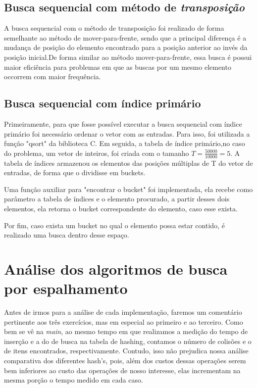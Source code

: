 \documentclass{article}
\begin{document}
\subsection{Busca sequencial com método de \textit{transposição}}
%
A busca sequencial com o método de transposição foi realizado de forma semelhante ao método de mover-para-frente, sendo que a principal diferença é a mudança de posição do elemento encontrado para a posição anterior ao invés da posição inicial.De forma similar ao método mover-para-frente, essa busca é possui maior eficiência para problemas em que as buscas por um mesmo elemento occorrem com maior frequência.
%
\subsection{Busca sequencial com índice primário}
%
Primeiramente, para que fosse possível executar a busca sequencial com índice primário foi necessário ordenar o vetor com as entradas. Para isso, foi utilizada a função "qsort" da biblioteca C. Em seguida, a tabela de índice primário,no caso do problema, um vetor de inteiros, foi criada com o tamanho $T=\frac{50000}{10000}=5$. A tabela de índices armazenou os elementos das posições múltiplas de T do vetor de entradas, de forma que o dividisse em buckets.

Uma função auxiliar para "encontrar o bucket" foi implementada, ela recebe como parâmetro a tabela de índices e o elemento procurado, a partir desses dois elementos, ela retorna o bucket correspondente do elemento, caso esse exista.

Por fim, caso exista um bucket no qual o elemento possa estar contido, é realizado uma busca dentro desse espaço.
%
\section{Análise dos algoritmos de busca por espalhamento}
Antes de irmos para a análise de cada implementação, faremos um comentário pertinente aos três exercícios, mas em especial ao primeiro e ao terceiro. Como bem se vê na \textit{main}, ao mesmo tempo em que realizamos a medição do tempo de inserção e a do de busca na tabela de hashing, contamos o número de colisões e o de itens encontrados, respectivamente. Contudo, isso não prejudica nossa análise comparativa dos diferentes hash's, pois, além dos custos dessas operações serem bem inferiores ao custo das operações de nosso interesse, elas incrementam na mesma porção o tempo medido em cada caso.
\end{document}

